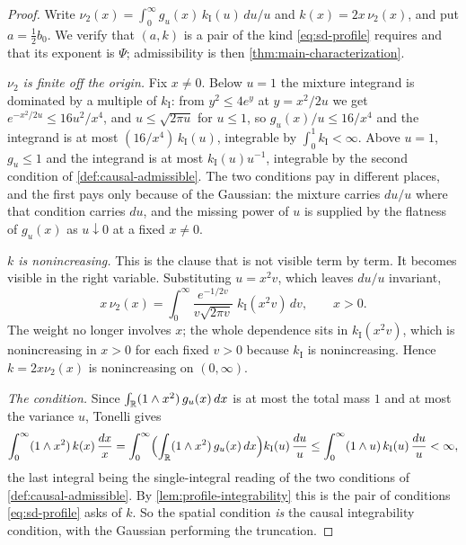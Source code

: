 \begin{proof}
\leanok
Write $\nu_2(x) = \int_0^\infty g_u(x)\,k_{\mathrm I}(u)\,du/u$ and $k(x) = 2x\,\nu_2(x)$, and
put $a = \tfrac12 b_0$. We verify that $(a,k)$ is a pair of the kind \ref{eq:sd-profile}
requires and that its exponent is $\Psi$; admissibility is then \ref{thm:main-characterization}.

\emph{$\nu_2$ is finite off the origin.} Fix $x \ne 0$. Below $u = 1$ the mixture integrand is
dominated by a multiple of $k_{\mathrm I}$: from $y^2 \le 4e^y$ at $y = x^2/2u$ we get
$e^{-x^2/2u} \le 16u^2/x^4$, and $u \le \sqrt{2\pi u}$ for $u \le 1$, so
$g_u(x)/u \le 16/x^4$ and the integrand is at most $(16/x^4)\,k_{\mathrm I}(u)$, integrable by
$\int_0^1 k_{\mathrm I} < \infty$. Above $u = 1$, $g_u \le 1$ and the integrand is at most
$k_{\mathrm I}(u)u^{-1}$, integrable by the second condition of \ref{def:causal-admissible}. The
two conditions pay in different places, and the first pays only because of the Gaussian: the
mixture carries $du/u$ where that condition carries $du$, and the missing power of $u$ is
supplied by the flatness of $g_u(x)$ as $u \downarrow 0$ at a fixed $x \ne 0$.

\emph{$k$ is nonincreasing.} This is the clause that is not visible term by term. It becomes
visible in the right variable. Substituting $u = x^2v$, which leaves $du/u$ invariant,
\begin{equation}\label{eq:bridge-scaling}
  x\,\nu_2(x) = \int_0^\infty \frac{e^{-1/2v}}{v\sqrt{2\pi v}}\;k_{\mathrm I}(x^2v)\,dv ,
  \qquad x > 0 .
\end{equation}
The weight no longer involves $x$; the whole dependence sits in $k_{\mathrm I}(x^2v)$, which is
nonincreasing in $x > 0$ for each fixed $v > 0$ because $k_{\mathrm I}$ is nonincreasing. Hence
$k = 2x\nu_2(x)$ is nonincreasing on $(0,\infty)$.

\emph{The \Levy{} condition.} Since $\int_{\mathbb{R}} (1 \wedge x^2)\,g_u(x)\,dx$ is at most the total mass
$1$ and at most the variance $u$, Tonelli gives
\[
  \int_0^\infty (1 \wedge x^2)\,k(x)\,\frac{dx}{x}
   = \int_0^\infty\Bigl(\int_{\mathbb{R}} (1 \wedge x^2)\,g_u(x)\,dx\Bigr) k_{\mathrm I}(u)\,\frac{du}{u}
   \le \int_0^\infty (1 \wedge u)\,k_{\mathrm I}(u)\,\frac{du}{u} < \infty,
\]
the last integral being the single-integral reading of the two conditions of
\ref{def:causal-admissible}. By \ref{lem:profile-integrability} this is the pair of conditions
\ref{eq:sd-profile} asks of $k$. So the spatial \Levy{} condition \emph{is} the causal
integrability condition, with the Gaussian performing the truncation.


\end{proof}
